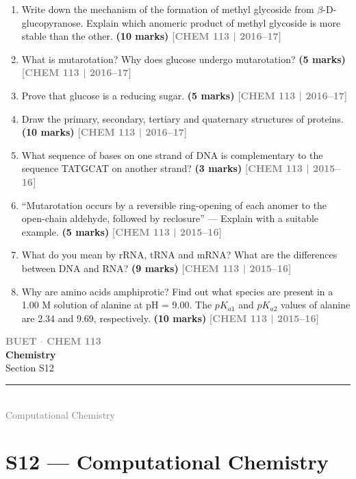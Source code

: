 \documentclass[12pt,a3paper]{article}
\newcommand{\yr}[1]{\hfill\textcolor{gray}{\small\textbf{[#1]}}}
\newcommand{\mk}[1]{\textcolor{orange!70!black}{\small\textbf{(#1 marks)}}}
\newcommand{\secdivider}[4]{%
  \newpage\thispagestyle{empty}%
  \vspace*{\fill}%
  \begin{tcolorbox}[enhanced,colback=#4!7,colframe=#3,boxrule=1.5pt,arc=8pt,
    left=20pt,right=20pt,top=22pt,bottom=22pt,
    shadow={3pt}{-3pt}{0pt}{black!15}]
    \centering
    {\large\textcolor{gray}{\textbf{BUET $\cdot$ CHEM 113}}}\\[8pt]
    {\fontsize{26}{32}\selectfont\bfseries\textcolor{#3}{Chemistry}}\\[6pt]
    {\fontsize{15}{19}\selectfont\textcolor{dgray}{#1}}\\[12pt]
    \textcolor{#3!60}{\rule{0.5\textwidth}{0.5pt}}\\[6pt]
    {\small\textcolor{gray}{#2}}
  \end{tcolorbox}%
  \vspace*{\fill}\newpage%
}
\begin{document}
\begin{enumerate}
\item Write down the mechanism of the formation of methyl glycoside from $\beta$-D-glucopyranose. Explain which anomeric product of methyl glycoside is more stable than the other. \mk{10}
\yr{CHEM 113 | 2016--17}



\item What is mutarotation? Why does glucose undergo mutarotation? \mk{5}
\yr{CHEM 113 | 2016--17}



\item Prove that glucose is a reducing sugar. \mk{5}
\yr{CHEM 113 | 2016--17}



\item Draw the primary, secondary, tertiary and quaternary structures of proteins. \mk{10}
\yr{CHEM 113 | 2016--17}



\item What sequence of bases on one strand of DNA is complementary to the sequence TATGCAT on another strand? \mk{3}
\yr{CHEM 113 | 2015--16}



\item ``Mutarotation occurs by a reversible ring-opening of each anomer to the open-chain aldehyde, followed by reclosure'' --- Explain with a suitable example. \mk{5}
\yr{CHEM 113 | 2015--16}



\item What do you mean by rRNA, tRNA and mRNA? What are the differences between DNA and RNA? \mk{9}
\yr{CHEM 113 | 2015--16}



\item Why are amino acids amphiprotic? Find out what species are present in a 1.00 M solution of alanine at pH = 9.00. The $pK_{a1}$ and $pK_{a2}$ values of alanine are 2.34 and 9.69, respectively. \mk{10}
\yr{CHEM 113 | 2015--16}




\end{enumerate}
\newpage


\secdivider{Section S12}{Computational Chemistry}{cE}{cE}
\label{sec:S12}
\section{S12 --- Computational Chemistry}
\end{document}
